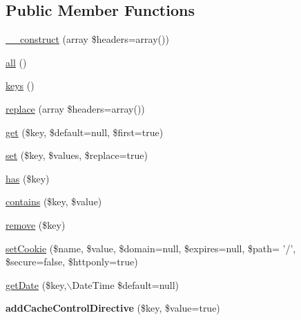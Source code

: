 \subsection*{\-Public \-Member \-Functions}
\begin{DoxyCompactItemize}
\item 
\hyperlink{class_symfony_1_1_component_1_1_http_foundation_1_1_header_bag_aa157640d8b60c9dcba9df4c2770a3963}{\-\_\-\-\_\-construct} (array \$headers=array())
\item 
\hyperlink{class_symfony_1_1_component_1_1_http_foundation_1_1_header_bag_af9d14e4ae6227970ad603987781573ca}{all} ()
\item 
\hyperlink{class_symfony_1_1_component_1_1_http_foundation_1_1_header_bag_a3b0db17d4be3aff5451d2764e7c88beb}{keys} ()
\item 
\hyperlink{class_symfony_1_1_component_1_1_http_foundation_1_1_header_bag_a8727b715a53cbd198c2fcd5ad93b34f8}{replace} (array \$headers=array())
\item 
\hyperlink{class_symfony_1_1_component_1_1_http_foundation_1_1_header_bag_a710f742356e1820a2ccf25a8ce825693}{get} (\$key, \$default=null, \$first=true)
\item 
\hyperlink{class_symfony_1_1_component_1_1_http_foundation_1_1_header_bag_a3296aad565e4d799d370a8ce7b8e3576}{set} (\$key, \$values, \$replace=true)
\item 
\hyperlink{class_symfony_1_1_component_1_1_http_foundation_1_1_header_bag_a8b23dbb48f0c3c94725695191d06981a}{has} (\$key)
\item 
\hyperlink{class_symfony_1_1_component_1_1_http_foundation_1_1_header_bag_ac1a0ff0f5d24decb9c7f578546052790}{contains} (\$key, \$value)
\item 
\hyperlink{class_symfony_1_1_component_1_1_http_foundation_1_1_header_bag_a95483af4e2c07dc9893fe058b026bd5d}{remove} (\$key)
\item 
\hyperlink{class_symfony_1_1_component_1_1_http_foundation_1_1_header_bag_a645f6c034cd6799b47bef2bc43e7056f}{set\-Cookie} (\$name, \$value, \$domain=null, \$expires=null, \$path= '/', \$secure=false, \$httponly=true)
\item 
\hyperlink{class_symfony_1_1_component_1_1_http_foundation_1_1_header_bag_aa9f141dfbff372ee124200520ce7dc7f}{get\-Date} (\$key,$\backslash$\-Date\-Time \$default=null)
\item 
\hypertarget{class_symfony_1_1_component_1_1_http_foundation_1_1_header_bag_a7ca6982de171270355bc791a0318829b}{
{\bfseries add\-Cache\-Control\-Directive} (\$key, \$value=true)}
\label{class_symfony_1_1_component_1_1_http_foundation_1_1_header_bag_a7ca6982de171270355bc791a0318829b}


\end{DoxyCompactItemize}
